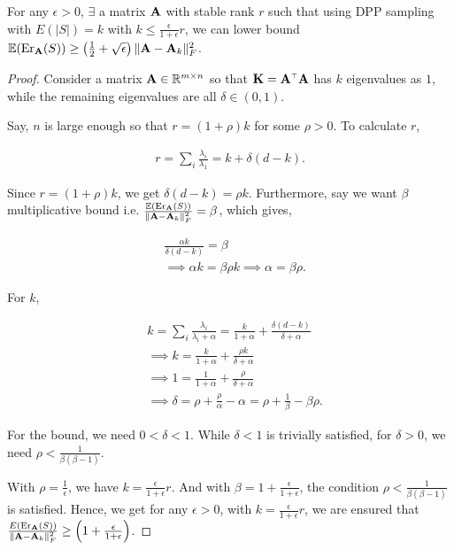 \documentclass{article}
\begin{document}
  
  \begin{lemma}
  	\label{l:algolowerbound}
  	For any $\epsilon>0$, $\exists$ a matrix $\mathbf A$ with stable rank $r$ such that using DPP sampling with $E(|S|) = k$ with $k \leq \frac{\epsilon}{1+\epsilon} r$, we can lower bound $\mathbb E(\mathrm{Er}_{\mathbf A}(S)) \geq \left(\frac1{2} + \sqrt{\epsilon}\right) \|\mathbf A -\mathbf A_k \|_F^2 $.
  \end{lemma}
  \begin{proof}
  	Consider a matrix $\mathbf A \in \mathbb R^{m\times n}$ so that $\K = \A^\top \A$ has $k$ eigenvalues as $1$, while the remaining eigenvalues are all $\delta \in (0,1)$.
  	
  	 Say, $n$ is large enough so that $r=(1+\rho) k$ for some $\rho > 0$.  To calculate $r$, 
  	
  	
  	\begin{align*}
  	r = \sum_i \frac {\lambda_i}{ \lambda_1}= k + \delta(d-k).
  	\end{align*}
  	
  	
  	
  	Since  $r=(1+\rho) k$, we get $\delta(d-k) = \rho k$. Furthermore, say we want $\beta$ multiplicative bound i.e. $\frac{\mathbb E(\mathrm{Er}_{\mathbf A}(S))}{\| \mathbf A - \mathbf A_k\|_F^2} = \beta$, which gives, 
  	
  	\begin{align*}
  	&\frac{\alpha k }{\delta(d-k) } = \beta \\ & \implies \alpha k = \beta \rho k \implies \alpha = \beta \rho.
  	\end{align*}
  	
  	For $k$, 
  	
  	\begin{align*}
  	& k = \sum_i \frac{\lambda_i}{\lambda_i + \alpha} 
  	= \frac{k}{1+\alpha} + \frac{\delta(d-k)}{\delta+\alpha} \\
  	& \implies k =  \frac{k}{1+\alpha} + \frac{\rho k}{\delta+\alpha}\\
  	&\implies 1 =  \frac{1}{1+\alpha} + \frac{\rho}{\delta+\alpha} \\
  	&\implies \delta = \rho + \frac{\rho}{\alpha} - \alpha = \rho + \frac1 {\beta} - \beta \rho.
  	\end{align*}
  	
  	For the bound, we need $0 < \delta < 1$. While $\delta < 1$ is trivially satisfied, for $\delta > 0$, we need $\rho < \frac{1}{\beta (\beta - 1)}$.
  	
  	With $\rho = \frac1 {\epsilon}$, we have $k = \frac{\epsilon}{1+ \epsilon}r$. And with $\beta =1+\frac{\epsilon}{1+ \epsilon} $, the condition $\rho < \frac{1}{\beta (\beta - 1)}$ is satisfied. Hence, we get for any $\epsilon>0$, with $k = \frac{\epsilon}{1+ \epsilon}r $, we are ensured that $\frac{E(\mathrm{Er}_{\mathbf A}(S))}{ \| \mathbf A - \mathbf A_k \|_F^2} \geq \left( 1 + \frac{\epsilon}{1+\epsilon} \right)$.                                                                                                                                                                                             
  	

\end{proof}
\end{document}
